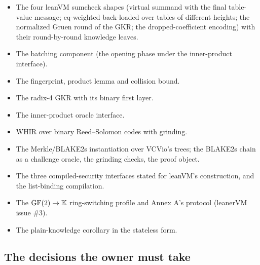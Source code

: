 \begin{itemize}
\item The four leanVM sumcheck shapes (virtual summand with the final table-value message;
  eq-weighted back-loaded over tables of different heights; the normalized Gruen round of the
  GKR; the dropped-coefficient encoding) with their round-by-round knowledge leaves.
\item The batching component (the opening phase under the inner-product interface).
\item The fingerprint, product lemma and collision bound.
\item The radix-4 GKR with its binary first layer.
\item The inner-product oracle interface.
\item WHIR over binary Reed--Solomon codes with grinding.
\item The Merkle/BLAKE2s instantiation over VCVio's trees; the BLAKE2s chain as a challenge
  oracle, the grinding checks, the proof object.
\item The three compiled-security interfaces stated for leanVM's construction, and the
  list-binding compilation.
\item The $\mathrm{GF}(2) \to \mathbb{K}$ ring-switching profile and Annex A's protocol (leanerVM issue
  \#3).
\item The plain-knowledge corollary in the stateless form.
\end{itemize}

\subsection{The decisions the owner must take}\label{sec:ark-decisions}

